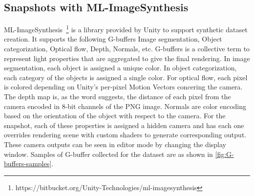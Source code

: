 \subsection{Snapshots with ML-ImageSynthesis}\label{subsec:snapshots-with-ml-imagesynthesis}

ML-ImageSynthesis~\footnote{https://bitbucket.org/Unity-Technologies/ml-imagesynthesis} is a library provided by Unity to support synthetic dataset creation.
It supports the following G-buffers Image segmentation, Object categorization, Optical flow, Depth, Normals, etc.
G-buffers is a collective term to represent light properties that are aggregated to give the final rendering.
In image segmentation, each object is assigned a unique color.
In object categorization, each category of the objects is assigned a single color.
For optical flow, each pixel is colored depending on Unity's per-pixel Motion Vectors concering the camera.
The depth map is, as the word suggests, the distance of each pixel from the camera encoded in 8-bit channels of the PNG image.
Normals are color encoding based on the orientation of the object with respect to the camera.
For the snapshot, each of these properties is assigned a hidden camera and has each one overrides rendering scene with custom shaders to generate corresponding output.
These camera outputs can be seen in editor mode by changing the display window.
Samples of G-buffer collected for the dataset are as shown in \autoref{fig:G-buffers-samples}.

